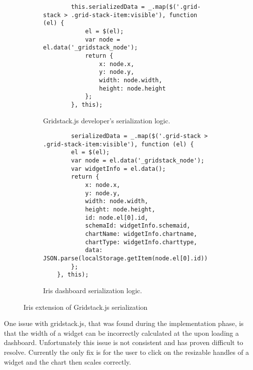 \documentclass[12pt,a4paper,titlepage]{report}
\begin{document}
\begin{figure}[H]
\centering
\begin{tcolorbox}
    \begin{subfigure}{\textwidth}
        \begin{tcolorbox}
        \centering
        \begin{verbatim}
        this.serializedData = _.map($('.grid-stack > .grid-stack-item:visible'), function (el) {
            el = $(el);
            var node = el.data('_gridstack_node');
            return {
                x: node.x,
                y: node.y,
                width: node.width,
                height: node.height
            };
        }, this);
        \end{verbatim}
        \caption{Gridstack.js developer's serialization logic.}\label{fig:Serialization_logic}
    \end{tcolorbox}
    \end{subfigure}%
    \newline
    \begin{subfigure}{\textwidth}
        \begin{tcolorbox}
        \centering
        \begin{verbatim}
        serializedData = _.map($('.grid-stack > .grid-stack-item:visible'), function (el) {
        el = $(el);
        var node = el.data('_gridstack_node');
        var widgetInfo = el.data();
        return {
            x: node.x,
            y: node.y,
            width: node.width,
            height: node.height,
            id: node.el[0].id,
            schemaId: widgetInfo.schemaid,
            chartName: widgetInfo.chartname,
            chartType: widgetInfo.charttype,
            data: JSON.parse(localStorage.getItem(node.el[0].id))
        };
    }, this);
        \end{verbatim}
        \caption{Iris dashboard serialization logic.}
    \end{tcolorbox}
    \end{subfigure}

\end{tcolorbox}
\caption{Iris extension of Gridstack.js serialization}
\end{figure}

One issue with gridstack.js, that was found during the implementation phase, is that the width of a widget can be incorrectly calculated at the upon loading a dashboard. Unfortunately this issue is not consistent and has proven difficult to resolve. Currently the only fix is for the user to click on the resizable handles of a widget and the chart then scales correctly.
\end{document}
